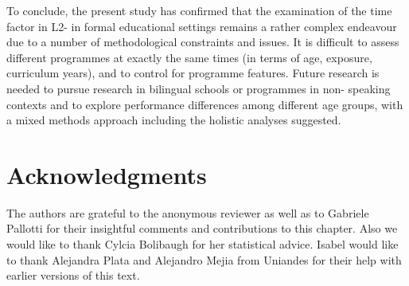 \documentclass[output=paper]{langsci/langscibook}
\begin{document}
To conclude, the present study has confirmed that the examination of the time factor in L2- in formal educational settings remains a rather complex endeavour due to a number of methodological constraints and issues. It is difficult to assess different programmes at exactly the same times (in terms of age,  exposure, curriculum years), and to control for programme features.  Future research is needed to pursue research in bilingual schools or  programmes in non- speaking contexts and to explore performance differences among different age groups, with a mixed methods approach including the holistic analyses suggested.

\section*{Acknowledgments}

The authors are grateful to the anonymous reviewer as well as to Gabriele Pallotti for their insightful comments and contributions to this chapter. Also we would like to thank Cylcia Bolibaugh for her statistical advice. Isabel would like to thank Alejandra Plata and Alejandro Mejia from Uniandes for their help with earlier versions of this text.
 
\sloppy
\printbibliography[heading=subbibliography,notkeyword=this] 
\end{document}

